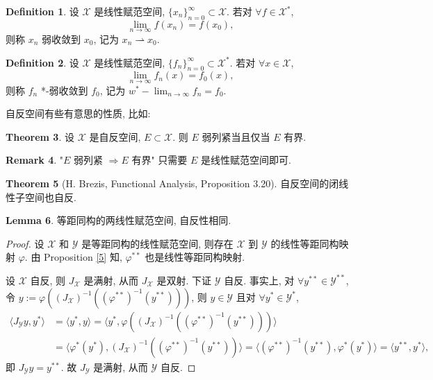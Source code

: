\documentclass[a4paper,11pt]{article}
\theoremstyle{definition}
\newtheorem{theorem}{Theorem}[section]
\newtheorem{lemma}[theorem]{Lemma}
\newtheorem{remark}[theorem]{Remark}
\newtheorem{definition}[theorem]{Definition}
\begin{document}
\begin{definition}
    设 $ \mathcal{X} $ 是线性赋范空间, $ \{x_n\}_{n = 0}^\infty \subset \mathcal{X} $. 
    若对 $ \forall f \in \mathcal{X}^* $, 
    $$ 
        \lim_{n \to \infty} f(x_n) = f(x_0),
    $$
    则称 $ x_n $ 弱收敛到 $ x_0 $, 记为 $ x_n \rightharpoonup x_0 $.
\end{definition}

\begin{definition}
    设 $ \mathcal{X} $ 是线性赋范空间, $ \{f_n\}_{n = 0}^\infty \subset \mathcal{X}^* $. 
    若对 $ \forall x \in \mathcal{X} $, 
    $$ 
        \lim_{n \to \infty} f_n(x) = f_0(x),
    $$
    则称 $ f_n $ *-弱收敛到 $ f_0 $, 记为 $ w^*-\lim_{n \to \infty} f_n = f_0 $.
\end{definition}

自反空间有些有意思的性质, 比如:

\begin{theorem}
    设 $ \mathcal{X} $ 是自反空间, $ E \subset \mathcal{X} $. 则
    $ E $ 弱列紧当且仅当 $ E $ 有界.
\end{theorem}

\begin{remark}
    "$ E $ 弱列紧 $ \Longrightarrow  E $ 有界" 只需要 $ E $ 是线性赋范空间即可.
\end{remark}

\begin{theorem}[H. Brezis, Functional Analysis, Proposition 3.20] \label{2}
    自反空间的闭线性子空间也自反.
\end{theorem}

\begin{lemma} \label{3}
    等距同构的两线性赋范空间, 自反性相同.
\end{lemma}

\begin{proof}
    设 $ \mathcal{X} $ 和 $ \mathcal{Y} $ 是等距同构的线性赋范空间, 
    则存在 $ \mathcal{X} $ 到 $ \mathcal{Y} $ 的线性等距同构映射 $ \varphi $.
    由 Proposition \ref{5} 知, $ \varphi^{**} $ 也是线性等距同构映射.
    
    设 $ \mathcal{X} $ 自反, 则 $ J_\mathcal{X} $ 是满射, 从而 $ J_\mathcal{X} $ 是双射. 
    下证 $ \mathcal{Y} $ 自反.
    事实上, 对 $ \forall y^{**} \in \mathcal{Y}^{**} $, 
    令 $ y := \varphi( (J_\mathcal{X})^{-1} ( (\varphi^{**})^{-1} (y^{**})) ) $, 
    则 $ y \in \mathcal{Y} $ 且对 $ \forall y^* \in \mathcal{Y}^* $,
    \begin{align*}
        \langle J_\mathcal{Y} y, y^* \rangle
            &= \langle y^*, y \rangle
            = \langle y^*, \varphi( (J_\mathcal{X})^{-1} ( (\varphi^{**})^{-1} (y^{**})) ) \rangle \\
            &= \langle \varphi^* (y^*), (J_\mathcal{X})^{-1} ( (\varphi^{**})^{-1} (y^{**})) \rangle
            = \langle  (\varphi^{**})^{-1} (y^{**}), \varphi^* (y^*) \rangle 
            = \langle y^{**}, y^* \rangle,
    \end{align*}
    即 $ J_\mathcal{Y} y = y^{**} $. 故 $ J_\mathcal{Y} $ 是满射, 从而 $ \mathcal{Y} $ 自反.
\end{proof}
\end{document}
